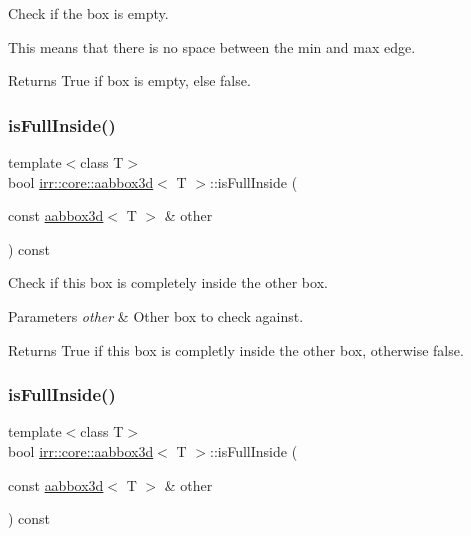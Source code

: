 Check if the box is empty. 

This means that there is no space between the min and max edge. \begin{DoxyReturn}{Returns}
True if box is empty, else false. 
\end{DoxyReturn}
\mbox{\label{classirr_1_1core_1_1aabbox3d_a81be1b0ba25d5adff30182ce0f9670ab}} 
\subsubsection{\texorpdfstring{is\+Full\+Inside()}{isFullInside()}\hspace{0.1cm}{\footnotesize\ttfamily [1/2]}}
{\footnotesize\ttfamily template$<$class T$>$ \\
bool \hyperlink{classirr_1_1core_1_1aabbox3d}{irr\+::core\+::aabbox3d}$<$ T $>$\+::is\+Full\+Inside (\begin{DoxyParamCaption}\item[{const \hyperlink{classirr_1_1core_1_1aabbox3d}{aabbox3d}$<$ T $>$ \&}]{other }\end{DoxyParamCaption}) const\hspace{0.3cm}{\ttfamily [inline]}}



Check if this box is completely inside the \textquotesingle{}other\textquotesingle{} box. 


\begin{DoxyParams}{Parameters}
{\em other} & Other box to check against. \\
\hline
\end{DoxyParams}
\begin{DoxyReturn}{Returns}
True if this box is completly inside the other box, otherwise false. 
\end{DoxyReturn}
\mbox{\label{classirr_1_1core_1_1aabbox3d_a81be1b0ba25d5adff30182ce0f9670ab}} 
\subsubsection{\texorpdfstring{is\+Full\+Inside()}{isFullInside()}\hspace{0.1cm}{\footnotesize\ttfamily [2/2]}}
{\footnotesize\ttfamily template$<$class T$>$ \\
bool \hyperlink{classirr_1_1core_1_1aabbox3d}{irr\+::core\+::aabbox3d}$<$ T $>$\+::is\+Full\+Inside (\begin{DoxyParamCaption}\item[{const \hyperlink{classirr_1_1core_1_1aabbox3d}{aabbox3d}$<$ T $>$ \&}]{other }\end{DoxyParamCaption}) const\hspace{0.3cm}{\ttfamily [inline]}}



